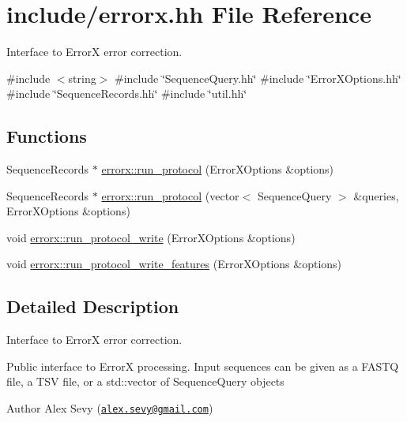 \hypertarget{errorx_8hh}{}\section{include/errorx.hh File Reference}
\label{errorx_8hh}


Interface to ErrorX error correction.  


{\ttfamily \#include $<$string$>$}\newline
{\ttfamily \#include \char`\"{}Sequence\+Query.\+hh\char`\"{}}\newline
{\ttfamily \#include \char`\"{}Error\+X\+Options.\+hh\char`\"{}}\newline
{\ttfamily \#include \char`\"{}Sequence\+Records.\+hh\char`\"{}}\newline
{\ttfamily \#include \char`\"{}util.\+hh\char`\"{}}\newline
\subsection*{Functions}
\begin{DoxyCompactItemize}
\item 
Sequence\+Records $\ast$ \mbox{\hyperlink{errorx_8hh_a33182a2b9ee89b4426ae558a5360bca5}{errorx\+::run\+\_\+protocol}} (Error\+X\+Options \&options)
\item 
Sequence\+Records $\ast$ \mbox{\hyperlink{errorx_8hh_a817846fe4bf6dc67945d9183acab0d0a}{errorx\+::run\+\_\+protocol}} (vector$<$ Sequence\+Query $>$ \&queries, Error\+X\+Options \&options)
\item 
void \mbox{\hyperlink{errorx_8hh_aae98824f02324bd868af3e80d593f45b}{errorx\+::run\+\_\+protocol\+\_\+write}} (Error\+X\+Options \&options)
\item 
void \mbox{\hyperlink{errorx_8hh_ac68a688383075e5f98f2cbdcc580bbb4}{errorx\+::run\+\_\+protocol\+\_\+write\+\_\+features}} (Error\+X\+Options \&options)
\end{DoxyCompactItemize}


\subsection{Detailed Description}
Interface to ErrorX error correction. 

Public interface to ErrorX processing. Input sequences can be given as a F\+A\+S\+TQ file, a T\+SV file, or a std\+::vector of Sequence\+Query objects \begin{DoxyAuthor}{Author}
Alex Sevy (\href{mailto:alex.sevy@gmail.com}{\tt alex.\+sevy@gmail.\+com}) 
\end{DoxyAuthor}


